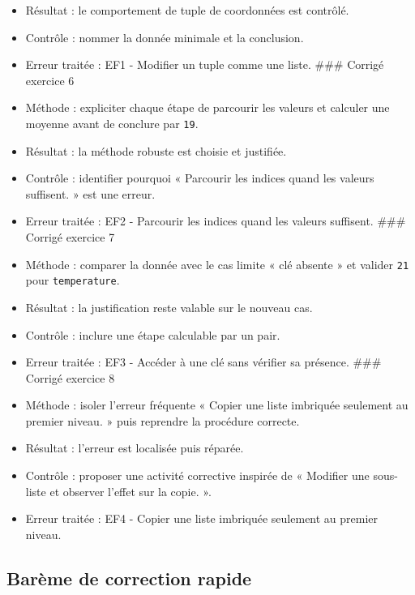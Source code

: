 \begin{itemize}
  coordonnées conservées.
\item
  Résultat : le comportement de tuple de coordonnées est contrôlé.
\item
  Contrôle : nommer la donnée minimale et la conclusion.
\item
  Erreur traitée : EF1 - Modifier un tuple comme une liste. \#\#\#
  Corrigé exercice 6
\item
  Méthode : expliciter chaque étape de parcourir les valeurs et calculer
  une moyenne avant de conclure par \texttt{19}.
\item
  Résultat : la méthode robuste est choisie et justifiée.
\item
  Contrôle : identifier pourquoi « Parcourir les indices quand les
  valeurs suffisent. » est une erreur.
\item
  Erreur traitée : EF2 - Parcourir les indices quand les valeurs
  suffisent. \#\#\# Corrigé exercice 7
\item
  Méthode : comparer la donnée avec le cas limite « clé absente » et
  valider \texttt{21} pour \texttt{temperature}.
\item
  Résultat : la justification reste valable sur le nouveau cas.
\item
  Contrôle : inclure une étape calculable par un pair.
\item
  Erreur traitée : EF3 - Accéder à une clé sans vérifier sa présence.
  \#\#\# Corrigé exercice 8
\item
  Méthode : isoler l'erreur fréquente « Copier une liste imbriquée
  seulement au premier niveau. » puis reprendre la procédure correcte.
\item
  Résultat : l'erreur est localisée puis réparée.
\item
  Contrôle : proposer une activité corrective inspirée de « Modifier une
  sous-liste et observer l'effet sur la copie. ».
\item
  Erreur traitée : EF4 - Copier une liste imbriquée seulement au premier
  niveau.
\end{itemize}

\subsection{Barème de correction rapide}

